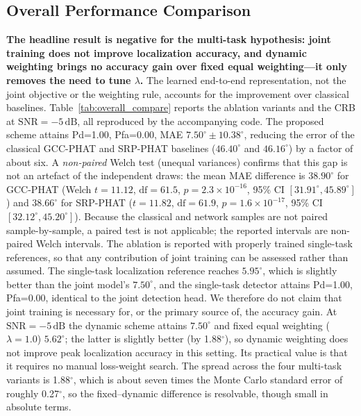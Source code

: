 \documentclass[5p,twocolumn]{elsarticle}
\begin{document}
\subsection{Overall Performance Comparison}
\textbf{The headline result is negative for the multi-task hypothesis: joint training does not improve localization accuracy, and dynamic weighting brings no accuracy gain over fixed equal weighting---it only removes the need to tune $\lambda$.} The learned end-to-end representation, not the joint objective or the weighting rule, accounts for the improvement over classical baselines. Table~\ref{tab:overall_compare} reports the ablation variants and the CRB at $\mathrm{SNR}=-5\,\mathrm{dB}$, all reproduced by the accompanying code. The proposed scheme attains Pd=1.00, Pfa=0.00, MAE $7.50^\circ\pm10.38^\circ$, reducing the error of the classical GCC-PHAT and SRP-PHAT baselines ($46.40^\circ$ and $46.16^\circ$) by a factor of about six. A \emph{non-paired} Welch test (unequal variances) confirms that this gap is not an artefact of the independent draws: the mean MAE difference is $38.90^\circ$ for GCC-PHAT (Welch $t=11.12$, $\mathrm{df}=61.5$, $p=2.3\times10^{-16}$, 95\% CI $[31.91^\circ,45.89^\circ]$) and $38.66^\circ$ for SRP-PHAT ($t=11.82$, $\mathrm{df}=61.9$, $p=1.6\times10^{-17}$, 95\% CI $[32.12^\circ,45.20^\circ]$). Because the classical and network samples are not paired sample-by-sample, a paired test is not applicable; the reported intervals are non-paired Welch intervals. The ablation is reported with properly trained single-task references, so that any contribution of joint training can be assessed rather than assumed. The single-task localization reference reaches $5.95^\circ$, which is slightly better than the joint model's $7.50^\circ$, and the single-task detector attains Pd=1.00, Pfa=0.00, identical to the joint detection head. We therefore do not claim that joint training is necessary for, or the primary source of, the accuracy gain. At $\mathrm{SNR}=-5\,\mathrm{dB}$ the dynamic scheme attains $7.50^\circ$ and fixed equal weighting ($\lambda=1.0$) $5.62^\circ$; the latter is slightly better (by 1.88$^\circ$), so dynamic weighting does not improve peak localization accuracy in this setting. Its practical value is that it requires no manual loss-weight search. The spread across the four multi-task variants is 1.88$^\circ$, which is about seven times the Monte Carlo standard error of roughly 0.27$^\circ$, so the fixed--dynamic difference is resolvable, though small in absolute terms.
\end{document}
